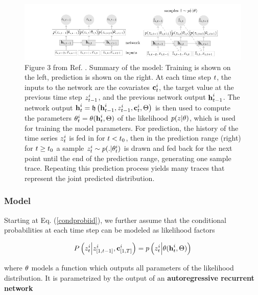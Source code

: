 \documentclass[11pt,headings=small]{scrartcl}
\begin{document}
\begin{figure}
	\includegraphics[width=\linewidth]{pics/RNN_DeepAR.png}
	\caption{Figure 3 from Ref. \cite{SALINAS20201181}. Summary of the model: Training is shown on the left, prediction is shown on the right. At each time step $t$, the inputs to the network are the covariates $\textbf{c}^{i}_{t}$, the target value at the previous time step $z^{i}_{t-1}$, and the previous network output $\textbf{h}^{i}_{t-1}$. The network output $\textbf{h}_{t}^{i} =  \frak{h} \left(\textbf{h}^{i}_{t-1},z^{i}_{t-1},\textbf{c}^{i}_{t},\Theta   \right)$ is then used to compute the parameters $\theta^{i}_{t}=\theta(\textbf{h}_{t}^{i},\Theta)$ of the likelihood $p(z|\theta)$, which is used for training the model parameters. For prediction, the history of the time series $z^{i}_{t}$ is fed in for $t<t_{0}$, then in the prediction range (right) for $t\ge t_{0}$ a sample $z^{i}_{t} \sim p(.|\theta^{i}_{t})$ is drawn and fed back for the next point until the end of the prediction range, generating one sample trace. Repeating this prediction process yields many traces that represent the joint predicted distribution.}
	\label{fig:DeepAR}
\end{figure}

\subsubsection{Model}
\label{subsection:approach1model}


Starting at Eq. (\ref{condprobiid}), we further assume that the conditional probabilities at each time step can be modeled as likelihood factors

\begin{equation}\label{likelihood}
P \left( z^{i}_{t} \Big| z^{i}_{[1,t-1]} , \textbf{c}^{i}_{[1,T]} \right) =
p \left( z^{i}_{t} \Big| \theta(\textbf{h}_{t}^{i},\Theta) \right)
\end{equation}

where $\theta$ models a function which outputs all parameters of the likelihood distribution. It is parametrized by the output of an \textbf{autoregressive recurrent network}
\end{document}
